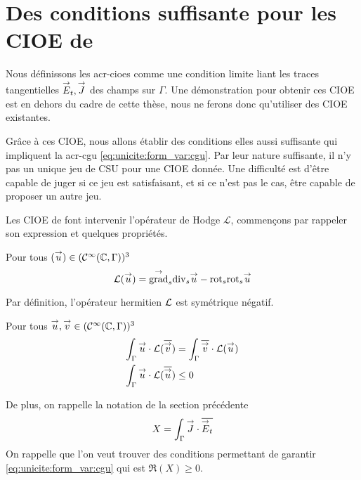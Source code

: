 \section[Des CSU pour les CIOE de Stupfel et Poget 2011]{Des conditions suffisante pour les CIOE de \cite{stupfel_sufficient_2011}}

  Nous définissons les \glspl{acr-cioe} comme une condition limite liant les traces tangentielles \({\overset{\rightarrow}{E}}_t, {\overset{\rightarrow}{J}}\) des champs sur \(\Gamma\). Une démonstration pour obtenir ces CIOE est en dehors du cadre de cette thèse, nous ne ferons donc qu'utiliser des CIOE existantes. 

  Grâce à ces CIOE, nous allons établir des conditions elles aussi suffisante qui impliquent la \gls{acr-cgu} \eqref{eq:unicite:form_var:cgu}. Par leur nature suffisante, il n'y pas un unique jeu de CSU pour une CIOE donnée. Une difficulté est d'être capable de juger si ce jeu est satisfaisant, et si ce n'est pas le cas, être capable de proposer un autre jeu.

  Les CIOE de \cite{stupfel_sufficient_2011} font intervenir l'opérateur de Hodge \(\mathcal{L}\), commençons par rappeler son expression et quelques propriétés.

  \begin{defn}
    Pour tous \(({\overset{\rightarrow}{u}}) \in (\mathcal C^\infty(\mathbb C,\Gamma))^3\)
    \begin{equation}
      \mathcal{L}({\overset{\rightarrow}{u}}) = {{\overset{\rightarrow}{\operatorname{grad}}}_s}{{\operatorname{div}_s} {\overset{\rightarrow}{u}}} - {{\operatorname{rot}}_s}{{{\operatorname{rot}}_s} {\overset{\rightarrow}{u}}}
    \end{equation}
  \end{defn}

  \begin{prop}
    Par définition, l’opérateur hermitien \(\mathcal{L}\) est symétrique négatif.

    Pour tous \({\overset{\rightarrow}{u}},{\overset{\rightarrow}{v}} \in (\mathcal C^\infty(\mathbb C,\Gamma))^3\)
    \begin{align}
      \int_\Gamma {\overset{\rightarrow}{u}}\cdot \mathcal{L}({\overline{{\overset{\rightarrow}{v}}}}) &= \int_\Gamma {\overline{{\overset{\rightarrow}{v}}}}\cdot \mathcal{L}({\overset{\rightarrow}{u}})
      \\
      \int_\Gamma {\overset{\rightarrow}{u}}\cdot \mathcal{L}({\overline{{\overset{\rightarrow}{u}}}}) &\le 0
    \end{align}
  \end{prop}

  De plus, on rappelle la notation de la section précédente
  \begin{equation}
    X = \int_\Gamma {\overset{\rightarrow}{J}} \cdot {\overline{{\overset{\rightarrow}{E}}_t}}
    \label{eq:unicite:2011:X}
  \end{equation}
  On rappelle que l'on veut trouver des conditions permettant de garantir \eqref{eq:unicite:form_var:cgu} qui est \(\Re(X)\ge0\).

